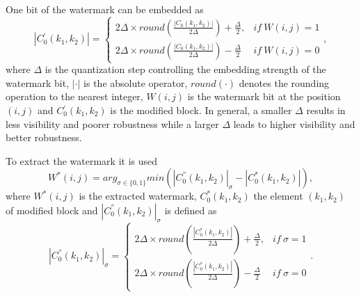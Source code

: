 \documentclass[runningheads]{llncs}
\begin{document}
One bit of the watermark can be embedded as
\begin{equation}
|C{}_{0}^{'}(k_{1},k_{2})|=\begin{cases}
2\Delta\times round(\frac{|C{}_{0}(k_{1},k_{2})|}{2\Delta})+\frac{\Delta}{2}, & if\:W(i,j)=1\\
2\Delta\times round(\frac{|C{}_{0}(k_{1},k_{2})|}{2\Delta})-\frac{\Delta}{2} & if\:W(i,j)=0
\end{cases},
\label{DMEm}
\end{equation}
where $\Delta$ is the quantization step controlling the embedding strength of the watermark bit, $|\cdot|$ is the absolute operator, $round(\cdot)$ denotes the rounding operation to the nearest integer, $W(i,j)$ is the watermark bit at the position $(i,j)$ and $C{}_{0}^{'}(k_{1},k_{2})$ is the modified block. In general, a smaller $\Delta$ results in less visibility and poorer robustness while a larger $\Delta$ leads to higher visibility and better robustness.

To extract the watermark it is used
\begin{equation}
W^{*}(i,j)=arg_{\sigma\in\{0,1\}}min(|C_{0}^{''}(k_{1},k_{2})|_{\sigma}-|C_{0}^{*}(k_{1},k_{2})|)
\label{DMEx},
\end{equation}
where $W^{*}(i,j)$ is the extracted watermark, $C_{0}^{*}(k_{1},k_{2})$ the element $(k_1, k_2)$ of modified block and $|C_{0}^{''}(k_{1},k_{2})|_{\sigma}$ is defined as
\begin{equation}
|C_{0}^{''}(k_{1},k_{2})|_{\sigma}=\begin{cases}
2\Delta\times round(\frac{|C_{0}^{*}(k_{1},k_{2})|}{2\Delta})+\frac{\Delta}{2}, & if\:\sigma=1\\
2\Delta\times round(\frac{|C_{0}^{*}(k_{1},k_{2})|}{2\Delta})-\frac{\Delta}{2} & if\:\sigma=0
\end{cases}.
\end{equation}
\end{document}
